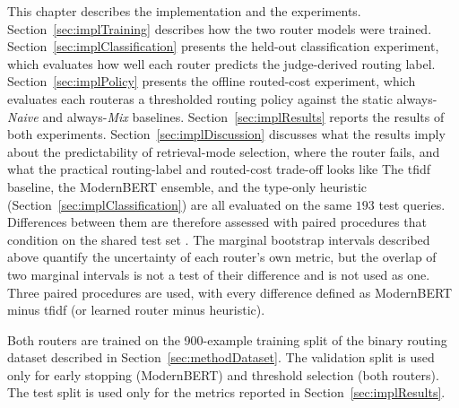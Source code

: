 \documentclass[english, bibtex]{kththesis}               %
\numberwithin{listing}{chapter}
\providecommand{\DIFaddtex}[1]{{\protect\color{blue} \sf #1}} %
\providecommand{\DIFdeltex}[1]{{\protect\color{red} \scriptsize #1}} %
\providecommand{\DIFaddbegin}{} %
\providecommand{\DIFaddend}{} %
\providecommand{\DIFdelbegin}{} %
\providecommand{\DIFdelend}{} %
\providecommand{\DIFadd}[1]{\texorpdfstring{\DIFaddtex{#1}}{#1}} %
\providecommand{\DIFdel}[1]{\texorpdfstring{\DIFdeltex{#1}}{}} %
\begin{document}
\DIFdelbegin \DIFdel{This chapter describes the implementation and the experiments. Section~\ref{sec:implTraining} describes how the two router models were trained. Section~\ref{sec:implClassification} presents the held-out classification experiment, which evaluates how well each router predicts the judge-derived routing label. Section~\ref{sec:implPolicy} presents the offline routed-cost experiment, which evaluates each routeras a thresholded routing policy against the static always-\emph{Naive} and always-\emph{Mix} baselines. Section~\ref{sec:implResults} reports the results of both experiments. Section~\ref{sec:implDiscussion} discusses what the results imply about the predictability of retrieval-mode selection, where the router fails, and what the practical routing-label and routed-cost trade-off looks like}\DIFdelend \DIFaddbegin \DIFadd{The \gls{tfidf} baseline, the ModernBERT ensemble, and the type-only heuristic (Section~\ref{sec:implClassification}) are all evaluated on the same $193$ test queries. Differences between them are therefore assessed with paired procedures that condition on the shared test set \cite{dietterich1998}. The marginal bootstrap intervals described above quantify the uncertainty of each router's own metric, but the overlap of two marginal intervals is not a test of their difference and is not used as one. Three paired procedures are used, with every difference defined as ModernBERT minus \gls{tfidf} (or learned router minus heuristic)}\DIFaddend .

\DIFdelbegin %

\DIFdel{Both routers are trained on the 900-example training split of the binary routing dataset described in Section~\ref{sec:methodDataset}. The validation split is used only for early stopping (ModernBERT) and threshold selection (both routers). The test split is used only for the metrics reported in Section~\ref{sec:implResults}.
}%

\end{document}
